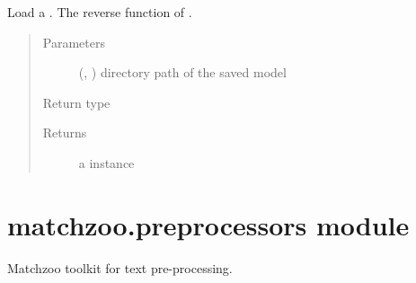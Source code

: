\documentclass[letterpaper,10pt,english]{sphinxmanual}
\begin{document}
\begin{fulllineitems}
\label{\detokenize{matchzoo:matchzoo.datapack.load_datapack}}
Load a . The reverse function of {\hyperref[\detokenize{matchzoo:matchzoo.datapack.DataPack.save}]{}}.
\begin{quote}\begin{description}
\item[{Parameters}] \leavevmode
{} (\sphinxcode{\sphinxupquote{Union}}{[}, \sphinxcode{\sphinxupquote{Path}}{]}) \textendash{} directory path of the saved model

\item[{Return type}] \leavevmode
{\hyperref[\detokenize{matchzoo:matchzoo.datapack.DataPack}]{}}

\item[{Returns}] \leavevmode
a {\hyperref[\detokenize{matchzoo:matchzoo.datapack.DataPack}]{}} instance

\end{description}\end{quote}

\end{fulllineitems}



\section{matchzoo.preprocessors module}
\label{\detokenize{matchzoo:matchzoo-preprocessors-module}}\label{\detokenize{matchzoo:module-matchzoo.preprocessors}}
Matchzoo toolkit for text pre-processing.
\end{document}

